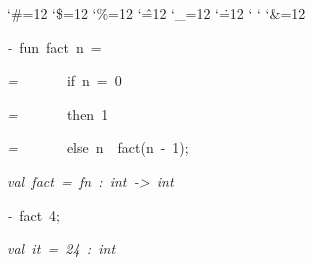 \begin{list}{}
{\setlength{\leftmargin}{\leftmargini}
\setlength{\rightmargin}{0cm}
\setlength{\itemindent}{0cm}
\setlength{\listparindent}{0cm}
\setlength{\itemsep}{0cm}
\setlength{\parsep}{0cm}
\setlength{\labelsep}{0cm}
\setlength{\labelwidth}{0cm}
\catcode`\#=12
\catcode`\$=12
\catcode`\%=12
\catcode`\^=12
\catcode`\_=12
\catcode`\.=12
\catcode`
\catcode`
\catcode`\&=12
\ttfamily}
\small
\item[]\textsl{-\ }fun\ fact\ n\ =
\item[]\textsl{=\ }\ \ \ \ \ \ if\ n\ =\ 0
\item[]\textsl{=\ }\ \ \ \ \ \ then\ 1
\item[]\textsl{=\ }\ \ \ \ \ \ else\ n\ \ fact(n\ -\ 1);
\item[]\textsl{val\ fact\ =\ fn\ :\ int\ ->\ int}
\item[]\textsl{-\ }fact\ 4;
\item[]\textsl{val\ it\ =\ 24\ :\ int}
\end{list}
